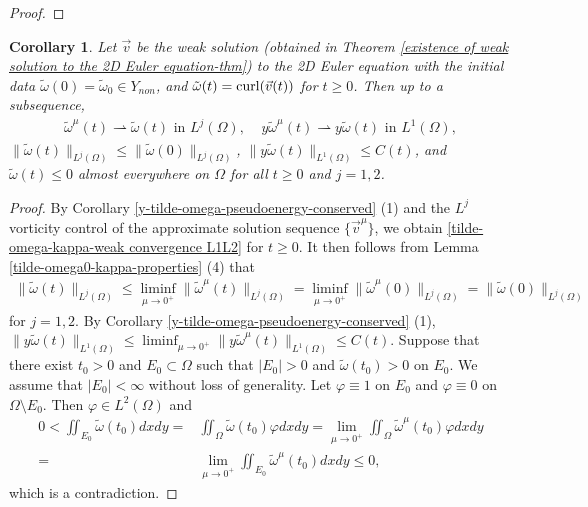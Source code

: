 \documentclass[1 [leqno, 11pt]{amsart}
\numberwithin{equation}{section}
\def\curl{\mathop{\rm curl}\nolimits}
\newtheorem{Corollary}[Theorem]{Corollary}
\begin{document}
\begin{CJK*}{GBK}{song}
\begin{appendix}
\begin{proof}
\end{proof}
\begin{Corollary}\label{vorticity L123}
Let $\vec{v}$ be the weak solution (obtained in Theorem \ref{existence of weak solution to the 2D Euler equation-thm}) to the 2D Euler  equation with the initial data $\tilde \omega(0)=\tilde \omega_0\in Y_{non}$, and $\tilde \omega(t)=\curl(\vec{v}(t))$ for $t\geq0$.
Then up to a subsequence,
\begin{align}\label{tilde-omega-kappa-weak convergence L1L2}
\tilde \omega^{\mu}(t)\rightharpoonup\tilde \omega(t) \text{ in }L^j(\Omega),\;\;\;\;y\tilde \omega^{\mu}(t)\rightharpoonup y\tilde \omega(t) \text{ in }L^1(\Omega),
\end{align}
$
\|\tilde \omega(t)\|_{L^j(\Omega)}\leq \|\tilde\omega (0)\|_{L^j(\Omega)}
$, $\|y\tilde \omega(t)\|_{L^1(\Omega)}\leq C(t)$,
and $\tilde \omega(t)\leq 0$ almost everywhere on $\Omega$
for all $t\geq0$ and $j=1,2$.
\end{Corollary}
\begin{proof}
By Corollary \ref{y-tilde-omega-pseudoenergy-conserved} (1) and the $L^j$ vorticity control of the approximate solution sequence $\{\vec{v}^{\mu}\}$, we obtain \eqref{tilde-omega-kappa-weak convergence L1L2} for $t\geq0$. It then follows from Lemma \ref{tilde-omega0-kappa-properties} (4) that
\begin{align*}
\|\tilde \omega(t)\|_{L^j(\Omega)}\leq \liminf_{\mu\to0^+}\|\tilde\omega^{\mu} (t)\|_{L^j(\Omega)}=\liminf_{\mu\to0^+}\|\tilde\omega^{\mu} (0)\|_{L^j(\Omega)}=\|\tilde\omega (0)\|_{L^j(\Omega)}
\end{align*}
for $j=1,2$. By Corollary \ref{y-tilde-omega-pseudoenergy-conserved} (1),
$\|y\tilde \omega(t)\|_{L^1(\Omega)}\leq \liminf_{\mu\to0^+}\|y\tilde\omega^{\mu} (t)\|_{L^1(\Omega)}\leq C(t)$.
Suppose that there exist $t_0>0$ and $E_0\subset\Omega$ such that $|E_0|>0$ and   $\tilde \omega(t_0)>0$ on $E_0$. We assume that $|E_0|<\infty$ without loss of generality. Let $\varphi\equiv1 $ on $E_0$ and $\varphi\equiv0$ on $\Omega\setminus E_0$. Then $\varphi\in L^2(\Omega)$ and
\begin{align*}
0<\iint_{E_0}\tilde \omega(t_0)dxdy=&\iint_{\Omega}\tilde \omega(t_0)\varphi dxdy=\lim_{\mu\to0^+}\iint_{\Omega}\tilde \omega^\mu(t_0)\varphi dxdy\\
=&\lim_{\mu\to0^+}\iint_{E_0}\tilde \omega^\mu(t_0)dxdy\leq 0,
\end{align*}
which is a contradiction.
\end{proof}
\end{appendix}


\end{CJK*}
\end{document}
